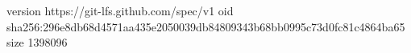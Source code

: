 version https://git-lfs.github.com/spec/v1
oid sha256:296e8db68d4571aa435e2050039db84809343b68bb0995c73d0fc81c4864ba65
size 1398096

